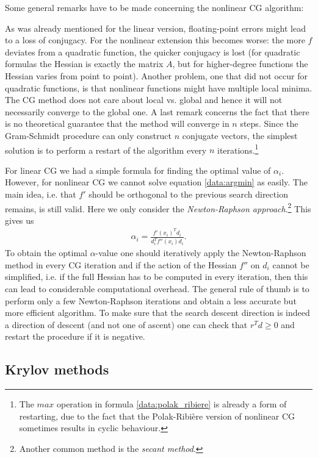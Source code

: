 {    Some general remarks have to be made concerning the nonlinear CG algorithm:
    \begin{remark}
        As was already mentioned for the linear version, floating-point errors might lead to a loss of conjugacy. For the nonlinear extension this becomes worse: the more $f$ deviates from a quadratic function, the quicker conjugacy is lost (for quadratic formulas the Hessian is exactly the matrix $A$, but for higher-degree functions the Hessian varies from point to point). Another problem, one that did not occur for quadratic functions, is that nonlinear functions might have multiple local minima. The CG method does not care about local vs. global and hence it will not necessarily converge to the global one. A last remark concerns the fact that there is no theoretical guarantee that the method will converge in $n$ steps. Since the Gram-Schmidt procedure can only construct $n$ conjugate vectors, the simplest solution is to perform a restart of the algorithm every $n$ iterations.\footnote{The $max$ operation in formula \ref{data:polak_ribiere} is already a form of restarting, due to the fact that the Polak-Ribi\`ere version of nonlinear CG sometimes results in cyclic behaviour.}
    \end{remark}

    For linear CG we had a simple formula for finding the optimal value of $\alpha_i$. However, for nonlinear CG we cannot solve equation \ref{data:argmin} as easily. The main idea, i.e. that $f'$ should be orthogonal to the previous search direction remains, is still valid. Here we only consider the \textit{Newton-Raphson approach}.\footnote{Another common method is the \textit{secant method}.} This gives us
    \begin{gather}
        \alpha_i = \frac{f'(x_i)^Td_i}{d_i^Tf''(x_i)d_i}.
    \end{gather}
    To obtain the optimal $\alpha$-value one should iteratively apply the Newton-Raphson method in every CG iteration and if the action of the Hessian $f''$ on $d_i$ cannot be simplified, i.e. if the full Hessian has to be computed in every iteration, then this can lead to considerable computational overhead. The general rule of thumb is to perform only a few Newton-Raphson iterations and obtain a less accurate but more efficient algorithm. To make sure that the search descent direction is indeed a direction of descent (and not one of ascent) one can check that $r^Td\geq0$ and restart the procedure if it is negative.

\subsection{Krylov methods}

}
